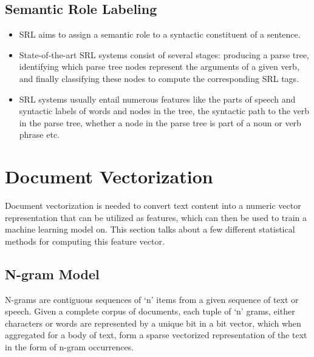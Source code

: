 \documentclass[11pt,a4paper]{article}
\begin{document}

  \subsection{Semantic Role Labeling} %
  \label{sub:semantic_role_labeling}

    \begin{itemize}
      \item
      SRL aims to assign a semantic role to a syntactic constituent of a sentence.
      \item
      State-of-the-art SRL systems consist of several stages: producing a parse tree, identifying which parse tree nodes represent the arguments of a given verb, and finally classifying these nodes to compute the corresponding SRL tags.
      \item
      SRL systems usually entail numerous features like the parts of speech and syntactic labels of words and nodes in the tree, the syntactic path to the verb in the parse tree, whether a node in the parse tree is part of a noun or verb phrase etc.
    \end{itemize}





\section{Document Vectorization} %
\label{sec:document_vectorization}

  Document vectorization is needed to convert text content into a numeric vector representation that can be utilized as features, which can then be used to train a machine learning model on. This section talks about a few different statistical methods for computing this feature vector. \cite{SemEvalPaper}

  \subsection{N-gram Model} %
  \label{sub:n_gram_model}
    N-grams are contiguous sequences of `n' items from a given sequence of text or speech. Given a complete corpus of documents, each tuple of `n' grams, either characters or words are represented by a unique bit in a bit vector, which when aggregated for a body of text, form a sparse vectorized representation of the text in the form of n-gram occurrences.
\end{document}
